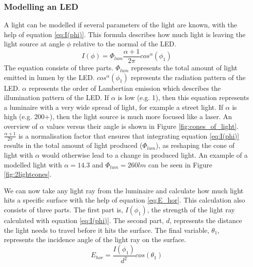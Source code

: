 \subsubsection{Modelling an LED}
A light can be modelled if several parameters of the light are known, with the help of equation \ref{eq:I(phi)}. This formula describes how much light is leaving the light source at angle $\phi$ relative to the normal of the LED.
\begin{equation}
\label{eq:I(phi)}
I(\phi)=\Phi_{lum}\frac{\alpha+1}{2\pi}cos^\alpha(\phi_1)
\end{equation}
The equation consists of three parts. $\Phi_{lum}$ represents the total amount of light emitted in lumen by the LED. $cos^\alpha(\phi_1)$ represents the radiation pattern of the LED. $\alpha$ represents the order of Lambertian emission which describes the illumination pattern of the LED. If $\alpha$ is low (e.g. 1), then this equation represents a luminaire with a very wide spread of light, for example a street light. If $\alpha$ is high (e.g. 200+), then the light source is much more focused like a laser. An overview of $\alpha$ values versus their angle is shown in Figure \ref{fig:cones_of_light}. $\frac{\alpha+1}{2\pi}$ is a normalisation factor that ensures that integrating equation \ref{eq:I(phi)} results in the total amount of light produced ($\Phi_{lum}$), as reshaping the cone of light with $\alpha$ would otherwise lead to a change in produced light. An example of a modelled light with $\alpha = 14.3$ and $\Phi_{lum} = 260lm$ can be seen in Figure \ref{fig:2lightcones}.

We can now take any light ray from the luminaire and calculate how much light hits a specific surface with the help of equation \ref{eq:E_hor}. This calculation also consists of three parts. The first part is, $I(\phi_1)$, the strength of the light ray calculated with equation \ref{eq:I(phi)}. The second part, $d$, represents the distance the light needs to travel before it hits the surface. The final variable, $\theta_1$, represents the incidence angle of the light ray on the surface.
\begin{equation}
\label{eq:E_hor}
E_{hor} = \frac{I(\phi_1)}{d^2} cos(\theta_1)
\end{equation}


